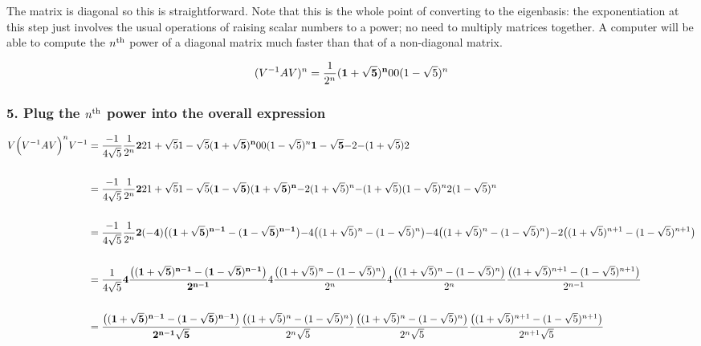 The matrix is diagonal so this is straightforward. Note that this is the whole
point of converting to the eigenbasis: the exponentiation at this step just
involves the usual operations of raising scalar numbers to a power; no need to
multiply matrices together. A computer will be able to compute the $n^{\text{th}}$ power
of a diagonal matrix much faster than that of a non-diagonal matrix.

$$
(V^{-1}AV)^n = \frac{1}{2^n} \mathbf{(1 + \sqrt 5)^n}{0          }
                                 {0              }{(1 - \sqrt 5)^n}
$$

\subsubsection{5. Plug the $n^{\text{th}}$ power into the overall expression}

\begin{align*}
V \Big(V^{-1}AV\Big)^n V^{-1}
&=
\frac{-1}{4\sqrt 5}
\frac{1}{2^n}
\mathbf{2          }{2          }
    {1 + \sqrt 5}{1 - \sqrt 5}
\mathbf{(1 + \sqrt 5)^n}{0              }
    {0              }{(1 - \sqrt 5)^n}
\mathbf{1 - \sqrt 5 }{-2}
    {-(1 + \sqrt 5)}{2}
\\\\
&=
\frac{-1}{4\sqrt 5}
\frac{1}{2^n}
\mathbf{2          }{2          }
    {1 + \sqrt 5}{1 - \sqrt 5}
\mathbf{(1 - \sqrt 5)(1 + \sqrt 5)^n}{-2(1 + \sqrt 5)^n}
    {-(1 + \sqrt 5)(1 - \sqrt 5)^n}{2(1 - \sqrt 5)^n}
\\\\
&=
\frac{-1}{4\sqrt 5}
\frac{1}{2^n}
\mathbf{2(-4)\big((1 + \sqrt 5)^{n-1} - (1 - \sqrt 5)^{n-1}\big)}{-4\big((1 + \sqrt 5)^n     - (1 - \sqrt 5)^n    \big)}
    {   -4\big((1 + \sqrt 5)^n     - (1 - \sqrt 5)^n    \big)}{-2\big((1 + \sqrt 5)^{n+1} - (1 - \sqrt 5)^{n+1}\big)}
\\\\
&=
\frac{1}{4\sqrt 5}
\mathbf{4\frac{\big((1 + \sqrt 5)^{n-1} - (1 - \sqrt 5)^{n-1}\big)}{2^{n-1}}}{4\frac{\big((1 + \sqrt 5)^n     - (1 - \sqrt 5)^n    \big)}{2^n    }}
    {4\frac{\big((1 + \sqrt 5)^n     - (1 - \sqrt 5)^n    \big)}{2^n    }}{ \frac{\big((1 + \sqrt 5)^{n+1} - (1 - \sqrt 5)^{n+1}\big)}{2^{n-1}}}
\\\\
&=
\mathbf{\frac{\big((1 + \sqrt 5)^{n-1} - (1 - \sqrt 5)^{n-1}\big)}{2^{n-1}\sqrt 5}}{\frac{\big((1 + \sqrt 5)^n     - (1 - \sqrt 5)^n    \big)}{2^n    \sqrt 5}}
    {\frac{\big((1 + \sqrt 5)^n     - (1 - \sqrt 5)^n    \big)}{2^n    \sqrt 5}}{\frac{\big((1 + \sqrt 5)^{n+1} - (1 - \sqrt 5)^{n+1}\big)}{2^{n+1}\sqrt 5}}
\end{align*}
